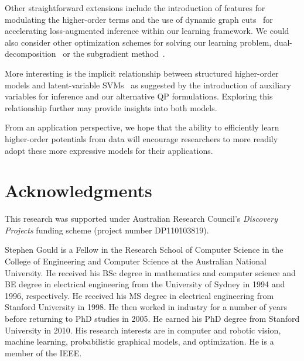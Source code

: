 \documentclass[10pt,journal,letterpaper,compsoc]{IEEEtran}
\renewcommand{\cite}{\citep}
\begin{document}
Other straightforward extensions include the introduction of features
for modulating the higher-order terms and the use of dynamic graph
cuts~\cite{Kohli:PAMI07} for accelerating loss-augmented inference
within our learning framework. We could also consider other
optimization schemes for solving our learning problem, \eg
dual-decomposition~\cite{Komodakis:CVPR2011} or the subgradient
method~\cite{Nowozin:2011, Bertsekas:2004}.

More interesting is the implicit relationship between structured
higher-order models and latent-variable SVMs~\cite{Yu:ICML09} as
suggested by the introduction of auxiliary variables for inference and
our alternative QP formulations. Exploring this relationship further
may provide insights into both models.

From an application perspective, we hope that the ability to
efficiently learn higher-order potentials from data will encourage
researchers to more readily adopt these more expressive models for
their applications.


\section*{Acknowledgments}
This research was supported under Australian Research Council's
\emph{Discovery Projects} funding scheme (project number DP110103819).



{
  
%  
  
}


\begin{IEEEbiography}{Stephen Gould}
is a Fellow in the Research School of Computer Science in the College
of Engineering and Computer Science at the Australian National
University. He received his BSc degree in mathematics and computer
science and BE degree in electrical engineering from the University of
Sydney in 1994 and 1996, respectively. He received his MS degree in
electrical engineering from Stanford University in 1998. He then
worked in industry for a number of years before returning to PhD
studies in 2005. He earned his PhD degree from Stanford University in
2010. His research interests are in computer and robotic vision,
machine learning, probabilistic graphical models, and optimization. He
is a member of the IEEE.
\end{IEEEbiography}
\end{document}
